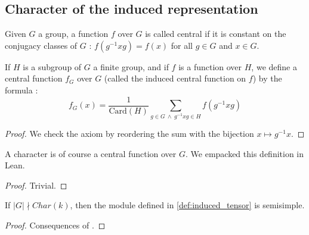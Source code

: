 \subsection{Character of the induced representation}

\begin{definition}
    \label{def:central_fun}
    \uses{}
    \leanok 
    Given $G$ a group, a function $f$ over $G$ is called central if it is constant on
    the conjugacy classes of $G$ : $f(g^{-1}xg)=f(x)$ for all $g\in G$ and $x\in G$.
\end{definition}

\begin{definition}
    \label{def:induced_central_fun}
    \leanok 
    If $H$ is a subgroup of $G$ a finite group, and if $f$ is a function over $H$, we define a central function 
    $f_G$ over $G$ (called the induced central function on $f$) by the formula :
    \begin{equation*}
        f_G(x)=\frac{1}{\text{Card}(H)}\sum\limits_{g\in G\ \wedge\ g^{-1}xg\in H}f(g^{-1}xg)
    \end{equation*}
\begin{proof} 
    \leanok
    We check the axiom by reordering the sum with the bijection $x\mapsto g^{-1}x$.
\end{proof}
\end{definition}

\begin{definition}
    \label{def:char_central_fun}
    \leanok 
    A character is of course a central function over $G$. We empacked this definition
    in Lean.
    \begin{proof}
        \leanok
        Trivial.
    \end{proof}
\end{definition}

\begin{proposition}
    \label{prop:tensor_semi_simple}
    \leanok 
    If $|G|\nmid Char(k)$, then the module defined in \ref{def:induced_tensor} is semisimple.
\end{proposition}
\begin{proof}
    \leanok
    Consequences of .
\end{proof}

